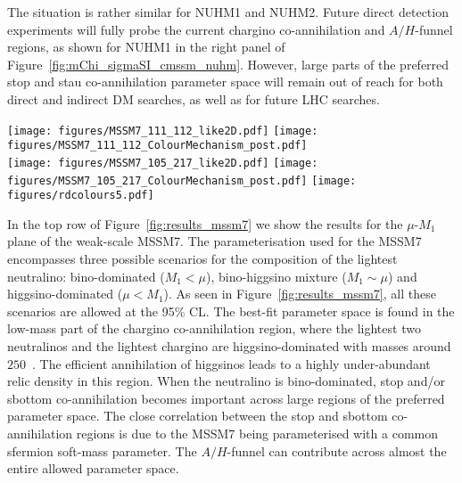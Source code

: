 \documentclass{PoS}
\newcommand{\eV}{\ensuremath{\text{e}\mspace{-0.8mu}\text{V}}\xspace}
\newcommand{\GeV}{\text{G\eV}\xspace}
\begin{document}
The situation is rather similar for NUHM1 and NUHM2. Future direct detection experiments will fully probe the current chargino co-annihilation and $A/H$-funnel regions, as shown for NUHM1 in the right panel of Figure~\ref{fig:mChi_sigmaSI_cmssm_nuhm}. However, large parts of the preferred stop and stau co-annihilation parameter space will remain out of reach for both direct and indirect DM searches, as well as for future LHC searches.


\begin{figure*}%
  \centering
  \texttt{[image: figures/MSSM7\_111\_112\_like2D.pdf]}
  \texttt{[image: figures/MSSM7\_111\_112\_ColourMechanism\_post.pdf]}\\
  \texttt{[image: figures/MSSM7\_105\_217\_like2D.pdf]}
  \texttt{[image: figures/MSSM7\_105\_217\_ColourMechanism\_post.pdf]}
  \texttt{[image: figures/rdcolours5.pdf]}
  \caption{
  \textit{Top left:} The MSSM7 profile likelihood ratio in the plane of the bino mass parameter $M_1$ and the higgsino mass parameter $\mu$. \textit{Top right:} The 95\% CL region in the same coloured according to which mechanisms deplete the relic density. \textit{Bottom:} Similar plots for the plane of the neutralino mass and the spin-independent neutralino-proton scattering cross-section. Figures from~\cite{MSSM}.
  }
  \label{fig:results_mssm7}
\end{figure*}

In the top row of Figure~\ref{fig:results_mssm7} we show the results for the $\mu$-$M_1$ plane of the weak-scale MSSM7. The parameterisation used for the MSSM7 encompasses three possible scenarios for the composition of the lightest neutralino: bino-dominated ($M_1 < \mu$), bino-higgsino mixture ($M_1 \sim \mu$) and higgsino-dominated ($\mu < M_1$). As seen in Figure~\ref{fig:results_mssm7}, all these scenarios are allowed at the 95\% CL. The best-fit parameter space is found in the low-mass part of the chargino co-annihilation region, where the lightest two neutralinos and the lightest chargino are higgsino-dominated with masses around $250$~\GeV. The efficient annihilation of higgsinos leads to a highly under-abundant relic density in this region. 
When the neutralino is bino-dominated, stop and/or sbottom co-annihilation becomes important across large regions of the preferred parameter space. The close correlation between the stop and sbottom co-annihilation regions is due to the MSSM7 being parameterised with a common sfermion soft-mass parameter. The $A/H$-funnel can contribute across almost the entire allowed parameter space. 
\end{document}
